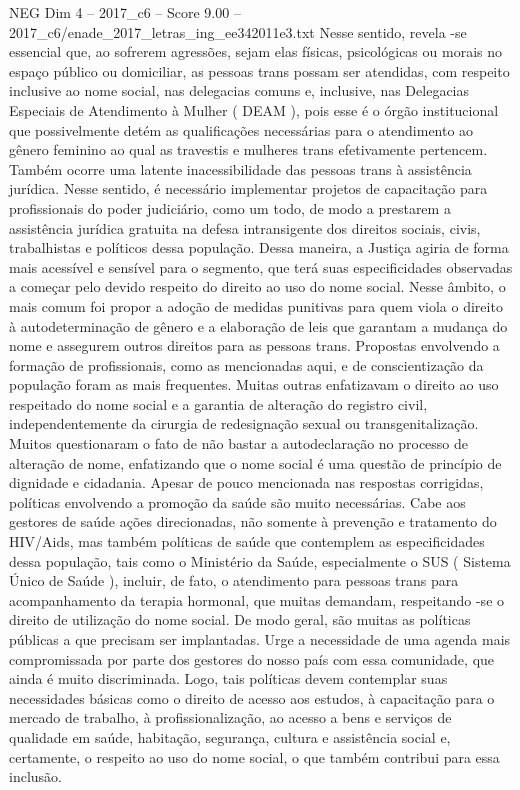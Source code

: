 \begin{textsample}{NEG Dim 4 – 2017\_c6 – Score 9.00 – 2017\_c6/enade\_2017\_letras\_ing\_ee342011e3.txt}
Nesse sentido, revela -se essencial que, ao sofrerem agressões, sejam elas físicas, psicológicas ou morais no espaço público ou domiciliar, as pessoas trans possam ser atendidas, com respeito inclusive ao nome social, nas delegacias comuns e, inclusive, nas Delegacias Especiais de Atendimento à Mulher ( DEAM ), pois esse é o órgão institucional que possivelmente detém as qualificações necessárias para o atendimento ao gênero feminino ao qual as travestis e mulheres trans efetivamente pertencem.
Também ocorre uma latente inacessibilidade das pessoas trans à assistência jurídica.
Nesse sentido, é necessário implementar projetos de capacitação para profissionais do poder judiciário, como um todo, de modo a prestarem a assistência jurídica gratuita na defesa intransigente dos direitos sociais, civis, trabalhistas e políticos dessa população.
Dessa maneira, a Justiça agiria de forma mais acessível e sensível para o segmento, que terá suas especificidades observadas a começar pelo devido respeito do direito ao uso do nome social.
Nesse âmbito, o mais comum foi propor a adoção de medidas punitivas para quem viola o direito à autodeterminação de gênero e a elaboração de leis que garantam a mudança do nome e assegurem outros direitos para as pessoas trans.
Propostas envolvendo a formação de profissionais, como as mencionadas aqui, e de conscientização da população foram as mais frequentes.
Muitas outras enfatizavam o direito ao uso respeitado do nome social e a garantia de alteração do registro civil, independentemente da cirurgia de redesignação sexual ou transgenitalização.
Muitos questionaram o fato de não bastar a autodeclaração no processo de alteração de nome, enfatizando que o nome social é uma questão de princípio de dignidade e cidadania.
Apesar de pouco mencionada nas respostas corrigidas, políticas envolvendo a promoção da saúde são muito necessárias.
Cabe aos gestores de saúde ações direcionadas, não somente à prevenção e tratamento do HIV/Aids, mas também políticas de saúde que contemplem as especificidades dessa população, tais como o Ministério da Saúde, especialmente o SUS ( Sistema Único de Saúde ), incluir, de fato, o atendimento para pessoas trans para acompanhamento da terapia hormonal, que muitas demandam, respeitando -se o direito de utilização do nome social.
De modo geral, são muitas as políticas públicas a que precisam ser implantadas.
Urge a necessidade de uma agenda mais compromissada por parte dos gestores do nosso país com essa comunidade, que ainda é muito discriminada.
Logo, tais políticas devem contemplar suas necessidades básicas como o direito de acesso aos estudos, à capacitação para o mercado de trabalho, à profissionalização, ao acesso a bens e serviços de qualidade em saúde, habitação, segurança, cultura e assistência social e, certamente, o respeito ao uso do nome social, o que também contribui para essa inclusão.

\end{textsample}
